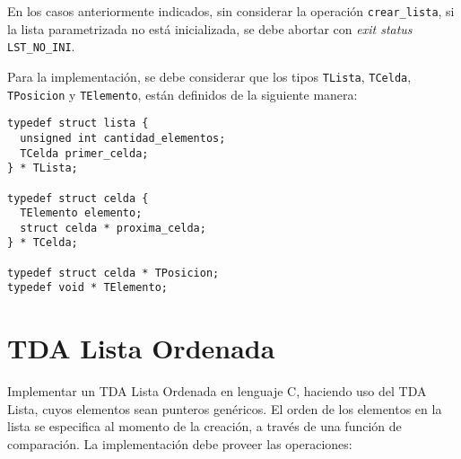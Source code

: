 \documentclass[12pt,a4paper]{article}
\begin{document}
En los casos anteriormente indicados, sin considerar la operación \texttt{crear\_lista}, si la lista parametrizada no está inicializada, se debe abortar con \emph{exit status} \texttt{LST\_NO\_INI}.

Para la implementación, se debe considerar que los tipos \texttt{TLista}, \texttt{TCelda}, \texttt{TPosicion} y \texttt{TElemento}, están definidos de la siguiente manera:

\begin{verbatim}
typedef struct lista {
  unsigned int cantidad_elementos;
  TCelda primer_celda;
} * TLista;

typedef struct celda {
  TElemento elemento;
  struct celda * proxima_celda;
} * TCelda;

typedef struct celda * TPosicion;
typedef void * TElemento;

\end{verbatim}

\section{TDA Lista Ordenada}
Implementar un TDA Lista Ordenada en lenguaje C, haciendo uso del TDA Lista, cuyos elementos sean punteros genéricos. El orden de los elementos en la lista se especifica al momento de la creación, a través de una función de comparación. La implementación debe proveer las operaciones:
\end{document}
